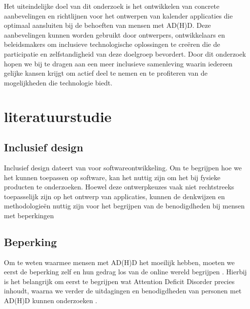 Het uiteindelijke doel van dit onderzoek is het ontwikkelen van concrete aanbevelingen en richtlijnen voor het ontwerpen van kalender applicaties die optimaal aansluiten bij de behoeften van mensen met AD(H)D. Deze aanbevelingen kunnen worden gebruikt door ontwerpers, ontwikkelaars en beleidsmakers om inclusieve technologische oplossingen te creëren die de participatie en zelfstandigheid van deze doelgroep bevordert. \newline \newline
Door dit onderzoek hopen we bij te dragen aan een meer inclusieve samenleving waarin iedereen gelijke kansen krijgt om actief deel te nemen en te profiteren van de mogelijkheden die technologie biedt.



\section{literatuurstudie}%
\label{sec:literatuurstudie}

\subsection{Inclusief design} %
Inclusief design dateert van voor softwareontwikkeling. Om te begrijpen hoe we het kunnen toepassen op software, kan het nuttig zijn om het bij fysieke producten te onderzoeken. Hoewel deze ontwerpkeuzes vaak niet rechtstreeks toepasselijk zijn op het ontwerp van applicaties, kunnen de denkwijzen en methodologieën nuttig zijn voor het begrijpen van de benodigdheden bij mensen met beperkingen \newline

\subsection{Beperking} %
Om te weten waarmee mensen met AD(H)D het moeilijk hebben, moeten we eerst de beperking zelf en hun gedrag los van de online wereld  begrijpen \autocite{VanHerwegen2019} . Hierbij is het belangrijk om eerst te begrijpen wat Attention Deficit Disorder precies inhoudt, waarna we verder de uitdagingen en benodigdheden van personen met AD(H)D kunnen onderzoeken \autocite{diamond2005attention}.
\newline

